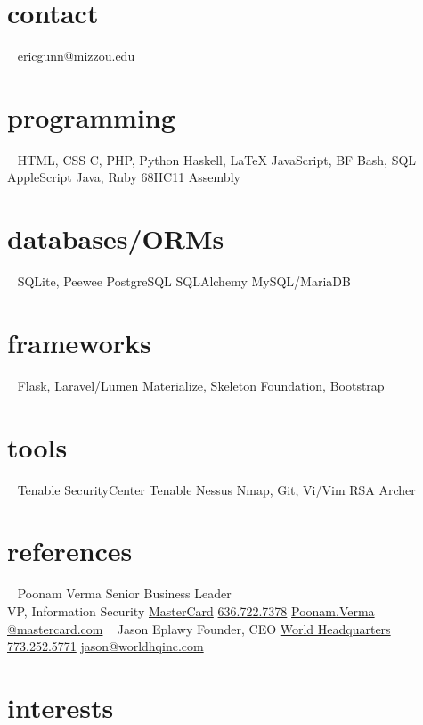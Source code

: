 \documentclass[print]{gunn-resume}
\begin{document}
\begin{aside}
  \section{contact}
  ~
    \href{mailto:ericgunn@mizzou.edu}{ericgunn@mizzou.edu}
  \section{programming}
  ~
    HTML, CSS
    C, PHP, Python
    Haskell, \LaTeX
    JavaScript, BF
    Bash, SQL
    AppleScript
    Java, Ruby
    68HC11 Assembly
 \section{databases/ORMs} 
 ~
 SQLite, Peewee
 PostgreSQL
 SQLAlchemy
 MySQL/MariaDB
 \section{frameworks}
 ~
 Flask, Laravel/Lumen
 Materialize, Skeleton
 Foundation, Bootstrap
 \section{tools}
 ~
 Tenable SecurityCenter
 Tenable Nessus
 Nmap, Git, Vi/Vim
 RSA Archer
 \section{references}
 ~
 Poonam Verma
 Senior Business Leader\\VP, Information Security
 \href{http://mastercard.com}{MasterCard}
 \href{16367227378}{636.722.7378}
\href{mailto:poonam.verma@mastercard.com}{Poonam.Verma\\@mastercard.com}
 ~
 Jason Eplawy
 Founder, CEO
 \href{http://worldhqinc.com}{World Headquarters}
 \href{17732525771}{773.252.5771}
\href{mailto:jason@worldhqinc.com}{jason@worldhqinc.com}
 ~
\end{aside}

\section{interests}
\end{document}
